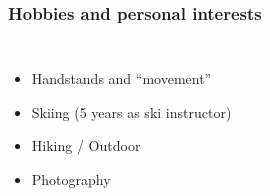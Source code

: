 \documentclass[
	10pt, %
]{beamer}
\begin{document}
	\begin{frame}
		\frametitle{Hobbies and personal interests}
		\begin{columns}

		\begin{minipage}[c][0.4\textheight][c]{\linewidth}
		\vspace{1cm}
		\begin{itemize}
			\item Handstands and ``movement''
			\item Skiing (5 years as ski instructor)
			\item Hiking / Outdoor 
			\item Photography
		\end{itemize}

		\end{minipage}
	

\end{columns}
\end{frame}
\end{document}
